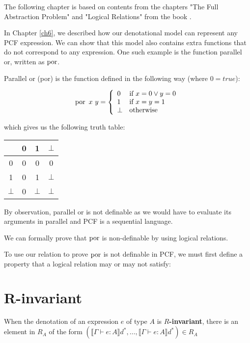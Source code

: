 The following chapter is based on contents from the chapters "The Full Abstraction Problem" and "Logical Relations" from the book \citep{Streicher06}.

In Chapter \ref{ch6}, we described how our denotational model can represent any PCF expression. We can show that this model also contains extra functions that do not correspond to any expression. One such example is the function parallel or, written as $\operatorname{por}$.

Parallel or (por) is the function defined in the following way (where $0 = true$):

\[ \operatorname{por} \ x \ y =
\left\{
	\begin{array}{ll}
		0  & \mbox{if } x = 0  \vee y = 0 \\
		1 & \mbox{if } x = y = 1 \\
		\bot & \mbox{otherwise}
	\end{array}
\right.\]

which gives us the following truth table:
\begin{center}
\begin{tabular}{ c | c | c | c}
    & 0 & 1 & $\bot$ \\
    \hline
   0 & 0 & 0 & 0 \\
   1 & 0 & 1 & $\bot$ \\
   $\bot$ & 0 & $\bot$ & $\bot$\\   
\end{tabular}
\end{center}

\vspace{0.5cm}

By observation, parallel or is not definable as we would have to evaluate its arguments in parallel and PCF is a sequential language.

We can formally prove that $\operatorname{por}$ is non-definable by using logical relations.



To use our relation to prove $\operatorname{por}$ is not definable in PCF, we must first define a property that a logical relation may or may not satisfy:

\section{R-invariant}

When the denotation of an expression $e$ of type $A$ is \textbf{$R$-invariant}, there is an element in $R_A$ of the form $(\llbracket \Gamma \vdash e : A \rrbracket d^*, \dots , \llbracket \Gamma \vdash e : A \rrbracket d^*) \in R_A$

